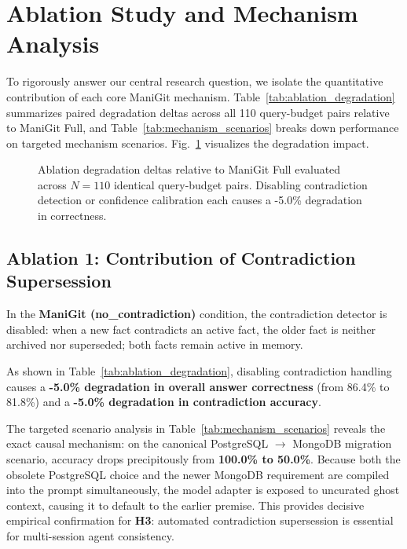 \section{Ablation Study and Mechanism Analysis}
\label{sec:ablation}
\label{sec:ablation_results}

To rigorously answer our central research question, we isolate the quantitative contribution of each core ManiGit mechanism. Table~\ref{tab:ablation_degradation} summarizes paired degradation deltas across all 110 query-budget pairs relative to ManiGit Full, and Table~\ref{tab:mechanism_scenarios} breaks down performance on targeted mechanism scenarios. Fig.~\ref{fig:ablation_degradation} visualizes the degradation impact.



\begin{figure}[t]
\centering

\caption{Ablation degradation deltas relative to ManiGit Full evaluated across $N=110$ identical query-budget pairs. Disabling contradiction detection or confidence calibration each causes a -5.0\% degradation in correctness.}
\label{fig:ablation_degradation}
\end{figure}

\subsection{Ablation 1: Contribution of Contradiction Supersession}
In the \textbf{ManiGit (no\_contradiction)} condition, the contradiction detector is disabled: when a new fact contradicts an active fact, the older fact is neither archived nor superseded; both facts remain active in memory.

As shown in Table~\ref{tab:ablation_degradation}, disabling contradiction handling causes a \textbf{-5.0\% degradation in overall answer correctness} (from 86.4\% to 81.8\%) and a \textbf{-5.0\% degradation in contradiction accuracy}. 

The targeted scenario analysis in Table~\ref{tab:mechanism_scenarios} reveals the exact causal mechanism: on the canonical PostgreSQL $\to$ MongoDB migration scenario, accuracy drops precipitously from \textbf{100.0\% to 50.0\%}. Because both the obsolete PostgreSQL choice and the newer MongoDB requirement are compiled into the prompt simultaneously, the model adapter is exposed to uncurated ghost context, causing it to default to the earlier premise. This provides decisive empirical confirmation for \textbf{H3}: automated contradiction supersession is essential for multi-session agent consistency.

